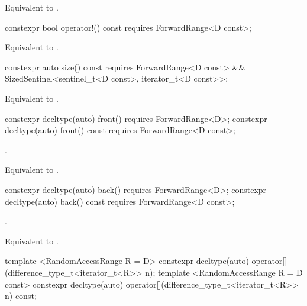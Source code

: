 \begin{itemdescr}
\pnum
\returns Equivalent to .
\end{itemdescr}

%
\begin{itemdecl}
constexpr bool operator!() const requires ForwardRange<D const>;
\end{itemdecl}

\begin{itemdescr}
\pnum
\returns Equivalent to .
\end{itemdescr}

%
\begin{itemdecl}
constexpr auto size() const requires ForwardRange<D const> &&
  SizedSentinel<sentinel_t<D const>, iterator_t<D const>>;
\end{itemdecl}

\begin{itemdescr}
\pnum
\returns Equivalent to .
\end{itemdescr}

%
\begin{itemdecl}
constexpr decltype(auto) front() requires ForwardRange<D>;
constexpr decltype(auto) front() const requires ForwardRange<D const>;
\end{itemdecl}

\begin{itemdescr}
\pnum
\requires {}.

\pnum
\returns Equivalent to .
\end{itemdescr}

%
\begin{itemdecl}
constexpr decltype(auto) back() requires ForwardRange<D>;
constexpr decltype(auto) back() const requires ForwardRange<D const>;
\end{itemdecl}

\begin{itemdescr}
\pnum
\requires {}.

\pnum
\returns Equivalent to .
\end{itemdescr}

%
\begin{itemdecl}
template <RandomAccessRange R = D>
  constexpr decltype(auto) operator[](difference_type_t<iterator_t<R>> n);
template <RandomAccessRange R = D const>
  constexpr decltype(auto) operator[](difference_type_t<iterator_t<R>> n) const;
\end{itemdecl}

